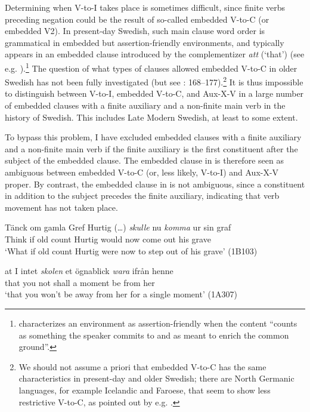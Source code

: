 \documentclass[output=paper, colorlinks, citecolor=brown]{langscibook}
\begin{document}
Determining when V-to-I takes place is sometimes difficult, since finite verbs preceding negation could be the result of so-called embedded V-to-C (or embedded V2). In present-day Swedish, such main clause word order is grammatical in embedded but assertion-friendly environments, and typically appears in an embedded clause introduced by the complementizer \textit{att} (‘that’) (see e.g. \citealt{Petersson2014}).\footnote{\citet[4]{Gartner2016} characterizes an environment as assertion-friendly when the content “counts as something the speaker commits to and as meant to enrich the common ground”.} The question of what types of clauses allowed embedded V-to-C in older Swedish has not been fully investigated (but see \citealt{Falk1993}: 168–177).\footnote{We should not assume a priori that embedded V-to-C has the same characteristics in present-day and older Swedish; there are North Germanic languages, for example Icelandic and Faroese, that seem to show less restrictive V-to-C, as pointed out by e.g. \citet{Gartner2016}.} It is thus impossible to distinguish between V-to-I, embedded V-to-C, and Aux-X-V in a large number of embedded clauses with a finite auxiliary and a non-finite main verb in the history of Swedish. This includes Late Modern Swedish, at least to some extent.



To bypass this problem, I have excluded embedded clauses with a finite auxiliary and a non-finite main verb if the finite auxiliary is the first constituent after the subject of the embedded clause. The embedded clause in  is therefore seen as ambiguous between embedded V-to-C (or, less likely, V-to-I) and Aux-X-V proper. By contrast, the embedded clause in  is not ambiguous, since a constituent in addition to the subject precedes the finite auxiliary, indicating that verb movement has not taken place.


\ea
\label{ex:sangfelt:24}
\ea\label{ex:sangfelt:24a}
\gll Tänck om gamla Gref {Hurtig (…)} \textit{skulle} {nu} \textit{komma} ur sin graf \\ %
 Think if old count Hurtig would now come out his grave\\
\glt ‘What if old count Hurtig were now to step out of his grave’ (1B103)

\ex\label{ex:sangfelt:24b}
\gll at I {intet} \textit{skolen} {et} {ögnablick} \textit{wara} ifrån henne \\
 that you not shall a moment be from her\\
\glt ‘that you won’t be away from her for a single moment’ (1A307)
\z
\z
\end{document}
